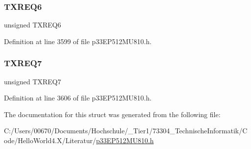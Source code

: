 \mbox{\label{structtag_c1_t_r67_c_o_n_b_i_t_s_a2c5aa76d2ac34727d2c3b1242fde4597}} 
\subsubsection{\texorpdfstring{T\+X\+R\+E\+Q6}{TXREQ6}}
{\footnotesize\ttfamily unsigned T\+X\+R\+E\+Q6}



Definition at line 3599 of file p33\+E\+P512\+M\+U810.\+h.

\mbox{\label{structtag_c1_t_r67_c_o_n_b_i_t_s_a787fc1af7ad34091400347d5ff70bd22}} 
\subsubsection{\texorpdfstring{T\+X\+R\+E\+Q7}{TXREQ7}}
{\footnotesize\ttfamily unsigned T\+X\+R\+E\+Q7}



Definition at line 3606 of file p33\+E\+P512\+M\+U810.\+h.



The documentation for this struct was generated from the following file\+:\begin{DoxyCompactItemize}
\item 
C\+:/\+Users/00670/\+Documents/\+Hochschule/\+\_\+\+Tier1/73304\+\_\+\+Technische\+Informatik/\+Code/\+Hello\+World4.\+X/\+Literatur/\hyperlink{p33_e_p512_m_u810_8h}{p33\+E\+P512\+M\+U810.\+h}\end{DoxyCompactItemize}
